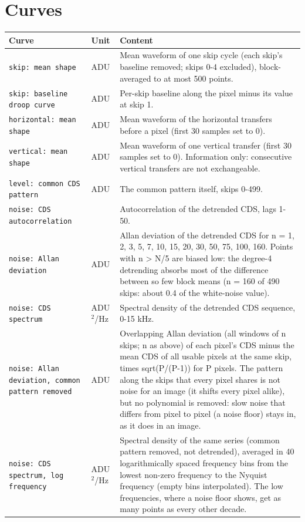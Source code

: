 \documentclass[10pt]{article}
\renewcommand{\_}{\oldunderscore\allowbreak}
\begin{document}
\section{Curves}
\begin{longtable}{>{\raggedright\arraybackslash}p{}>{\raggedright\arraybackslash}p{}>{\raggedright\arraybackslash}p{}}
\toprule Curve & Unit & Content \\ \midrule \endhead
\bottomrule \endfoot
\texttt{skip: mean shape} & ADU & Mean waveform of one skip cycle (each skip's baseline removed; skips 0-4 excluded), block-averaged to at most 500 points. \\
\texttt{skip: baseline droop curve} & ADU & Per-skip baseline along the pixel minus its value at skip 1. \\
\texttt{horizontal: mean shape} & ADU & Mean waveform of the horizontal transfers before a pixel (first 30 samples set to 0). \\
\texttt{vertical: mean shape} & ADU & Mean waveform of one vertical transfer (first 30 samples set to 0). Information only: consecutive vertical transfers are not exchangeable. \\
\texttt{level: common CDS pattern} & ADU & The common pattern itself, skips 0-499. \\
\texttt{noise: CDS autocorrelation} &  & Autocorrelation of the detrended CDS, lags 1-50. \\
\texttt{noise: Allan deviation} & ADU & Allan deviation of the detrended CDS for n = 1, 2, 3, 5, 7, 10, 15, 20, 30, 50, 75, 100, 160. Points with n \textgreater{} N/5 are biased low: the degree-4 detrending absorbs most of the difference between so few block means (n = 160 of 490 skips: about 0.4 of the white-noise value). \\
\texttt{noise: CDS spectrum} & ADU$^{2}$/Hz & Spectral density of the detrended CDS sequence, 0-15 kHz. \\
\texttt{noise: Allan deviation, common pattern removed} & ADU & Overlapping Allan deviation (all windows of n skips; n as above) of each pixel's CDS minus the mean CDS of all usable pixels at the same skip, times sqrt(P/(P-1)) for P pixels. The pattern along the skips that every pixel shares is not noise for an image (it shifts every pixel alike), but no polynomial is removed: slow noise that differs from pixel to pixel (a noise floor) stays in, as it does in an image. \\
\texttt{noise: CDS spectrum, log frequency} & ADU$^{2}$/Hz & Spectral density of the same series (common pattern removed, not detrended), averaged in 40 logarithmically spaced frequency bins from the lowest non-zero frequency to the Nyquist frequency (empty bins interpolated). The low frequencies, where a noise floor shows, get as many points as every other decade. \\

\end{longtable}
\end{document}

